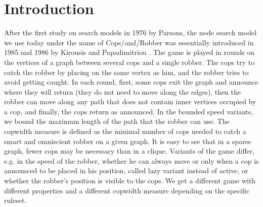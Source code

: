 \section{Introduction}
After the first study on search models in 1976 by Parsons\cite{parsons2006pursuit}, the node search model we use today under the name of Cops\-/and\-/Robber was essentially introduced in 1985 and 1986 by Kirousis and Papadimitriou \cite{kirousis1985interval,kirousis1986searching}.
The game is played in rounds on the vertices of a graph between several cops and a single robber.
The cops try to catch the robber by placing on the same vertex as him, and the robber tries to avoid getting caught.
In each round, first, some cops exit the graph and announce where they will return (they do not need to move along the edges), then the robber can move along any path that does not contain inner vertices occupied by a cop, and finally, the cops return as announced. In the bounded speed variants, we bound the maximum length of the path that the robber can use.
The copwidth measure is defined as the minimal number of cops needed to catch a smart and omniscient robber on a given graph.
It is easy to see that in a sparse graph, fewer cops may be necessary than in a clique.
Variants of the game differ, e.g. in the speed of the robber, whether he can always move or only when a cop is announced to be placed in his position, called lazy variant instead of active, or whether the robber's position is visible to the cops. We get a different game with different properties and a different copwidth measure depending on the specific ruleset.

